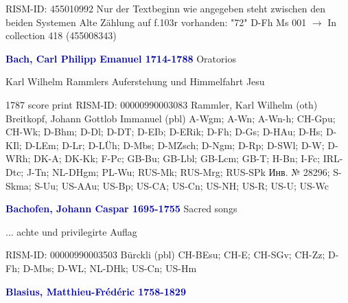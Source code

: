 \documentclass[twocolumn]{book}
\begin{document}
\newline RISM-ID: 455010992
\newline Nur der Textbeginn wie angegeben steht zwischen den beiden Systemen
\newline Alte Zählung auf f.103r vorhanden: "72"
\newline D-Fh  Ms 001
\newline $\rightarrow$ In collection 418 (455008343)

\newline \par \vspace{7pt} \textcolor{darkblue}{\textbf{Bach, Carl Philipp Emanuel  1714-1788}}
\newline Oratorios    
\newline \begin{itshape}Karl Wilhelm Rammlers Auferstehung und Himmelfahrt Jesu\end{itshape} 
\newline \textcolor{darkblue}{}  1787  score  
\newline print
\newline RISM-ID: 00000990003083
\newline Rammler, Karl Wilhelm  (oth)
\newline Breitkopf, Johann Gottlob Immanuel  (pbl)
\newline A-Wgm; A-Wn; A-Wn-h; CH-Gpu; CH-Wk; D-Bhm; D-Dl; D-DT; D-EIb; D-ERik; D-Fh; D-Gs; D-HAu; D-Hs; D-KIl; D-LEm; D-Lr; D-LÜh; D-Mbs; D-MZsch; D-Ngm; D-Rp; D-SWl; D-W; D-WRh; DK-A; DK-Kk; F-Pc; GB-Bu; GB-Lbl; GB-Lcm; GB-T; H-Bn; I-Fc; IRL-Dtc; J-Tn; NL-DHgm; PL-Wu; RUS-Mk; RUS-Mrg; RUS-SPk  Инв. № 28296; S-Skma; S-Uu; US-AAu; US-Bp; US-CA; US-Cn; US-NH; US-R; US-U; US-Wc
\newline \par \vspace{7pt} \textcolor{darkblue}{\textbf{Bachofen, Johann Caspar  1695-1755}}
\newline Sacred songs    
\newline \begin{itshape}... achte und privilegirte Auflag\end{itshape} 
\newline RISM-ID: 00000990003503
\newline Bürckli  (pbl)
\newline CH-BEsu; CH-E; CH-SGv; CH-Zz; D-Fh; D-Mbs; D-WL; NL-DHk; US-Cn; US-Hm
\newline \par \vspace{7pt} \textcolor{darkblue}{\textbf{Blasius, Matthieu-Frédéric  1758-1829}}
\end{document}
